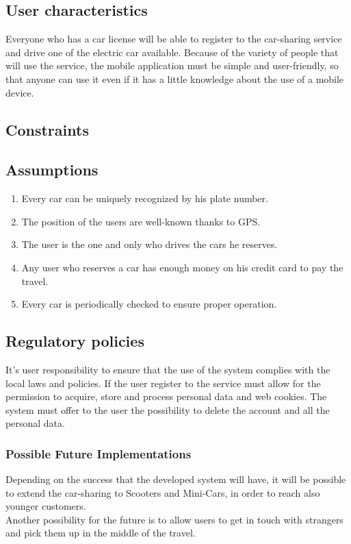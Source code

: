 \documentclass[english]{article}
\begin{document}
\subsection{User characteristics}
Everyone who has a car license will be able to register to the car-sharing service and drive one of the electric car available.
Because of the variety of people that will use the service, the mobile application must be simple and user-friendly, so that anyone can use it even if it has a little knowledge about the use of a mobile device.

\subsection{Constraints}



\subsection{Assumptions}
\begin{enumerate}
	\item Every car can be uniquely recognized by his plate number.
	\item The position of the users are well-known thanks to GPS.
	\item The user is the one and only who drives the cars he reserves.
	\item Any user who reserves a car has enough money on his credit card to pay the travel.
	\item Every car is periodically checked to ensure proper operation.
\end{enumerate}

\subsection{Regulatory policies}
It’s user responsibility to ensure that the use of the system complies with the local laws and policies. If the user register to the service must allow for the permission to acquire, store and process personal data and web cookies. The system must offer to the user the possibility to delete the account and all the personal data.


\subsubsection{Possible Future Implementations}
Depending on the success that the developed system will have, it will be possible to extend the car-sharing to Scooters and Mini-Cars, in order to reach also younger customers.
\\ \noindent 
Another possibility for the future is to allow users to get in touch with strangers and pick them up in the middle of the travel.
\pagebreak{}
\end{document}
